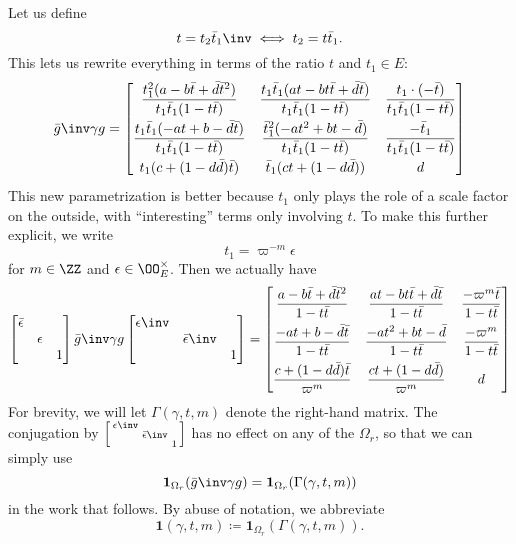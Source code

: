 Let us define \[ t = t_2 \bar t_1 \inv \iff t_2 = t \bar t_1. \]
This lets us rewrite everything in terms of the ratio $t$ and $t_1 \in E$:
\[
  \bar g \inv \gamma g
  =
  \begin{bmatrix}
    \dfrac{t_1^2(a-b\bar t+\bar d \bar t^2)}{t_1 \bar t_1(1-t \bar t)}
    & \dfrac{t_1 \bar t_1(at-bt\bar t+\bar d \bar t)}{t_1 \bar t_1(1-t \bar t)}
    & \dfrac{t_1 \cdot (-\bar t)}{t_1 \bar t_1 (1-t \bar t)} \\[2ex]
    \dfrac{t_1\bar t_1(-at+b-\bar d \bar t)}{t_1 \bar t_1(1-t \bar t)}
    & \dfrac{\bar t_1^2(-at^2+bt-\bar d)}{t_1 \bar t_1(1-t \bar t)}
    & \dfrac{-\bar t_1}{t_1 \bar t_1(1-t \bar t)} \\[2ex]
    t_1(c + (1-d\bar d)\bar t) & \bar t_1(ct + (1-d \bar d)) & d
  \end{bmatrix}
\]
This new parametrization is better because $t_1$ only plays the role of
a scale factor on the outside, with ``interesting'' terms only involving $t$.
To make this further explicit, we write
\[ t_1 = \varpi^{-m} \epsilon \]
for $m \in \ZZ$ and $\epsilon \in \OO_E^\times$.
Then we actually have
\[
  \begin{bmatrix} \bar\epsilon \\ & \epsilon \\ & & 1 \end{bmatrix}
  \bar g \inv \gamma g
  \begin{bmatrix} \epsilon\inv \\ & \bar\epsilon\inv \\ & & 1 \end{bmatrix}
  =
  \begin{bmatrix}
    \dfrac{a-b\bar t+\bar d \bar t^2}{1-t \bar t}
    & \dfrac{at-bt\bar t+\bar d \bar t}{1-t \bar t}
    & \dfrac{-\varpi^m \bar t}{1-t \bar t} \\[2ex]
    \dfrac{-at+b-\bar d \bar t}{1-t \bar t}
    & \dfrac{-at^2+bt-\bar d}{1-t \bar t}
    & \dfrac{-\varpi^m}{1-t \bar t} \\[2ex]
    \dfrac{c + (1-d\bar d)\bar t}{\varpi^m} & \dfrac{ct + (1-d \bar d)}{\varpi^m} & d
  \end{bmatrix}
\]
For brevity, we will let $\Gamma(\gamma, t, m)$ denote the right-hand matrix.
The conjugation by
$\left[ \begin{smallmatrix} \epsilon\inv \\ & \bar\epsilon\inv \\ & & 1 \end{smallmatrix} \right]$
has no effect on any of the $\Omega_r$, so that we can simply use
\[ \mathbf{1}_{\Omega_r}(\bar g \inv \gamma g) = \mathbf{1}_{\Omega_r}(\Gamma(\gamma, t, m)) \]
in the work that follows.
By abuse of notation, we abbreviate
\[ \mathbf{1}(\gamma, t, m) \coloneqq \mathbf{1}_{\Omega_r}(\Gamma(\gamma, t, m)). \]

